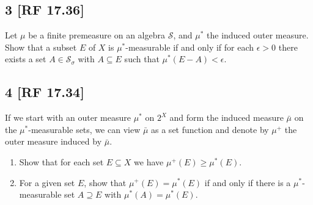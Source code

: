 \documentclass[12pt]{article}
\begin{document}
\subsection*{3 [RF 17.36]}
\begin{tcolorbox}
Let $\mu$ be a finite premeasure on an algebra $\mathcal{S}$, and $\mu^{*}$ the induced outer measure. Show that a subset $E$ of $X$ is
$\mu^*$-measurable if and only if for each $\epsilon > 0$ there exists a set $A \in \mathcal{S}_{\sigma}$ with $A\subseteq E$ such that $\mu^*(E-A) <
\epsilon$.
\end{tcolorbox}


\newpage
\subsection*{4 [RF 17.34]}
\begin{tcolorbox}
If we start with an outer measure $\mu^{*}$ on $2^{X}$ and form the induced measure $\bar{\mu}$ on the $\mu^{*}$-measurable sets, we can view
$\bar{\mu}$ as a set function and denote by $\mu^{+}$ the outer measure induced by $\bar{\mu}$.
\begin{enumerate}[label=(\alph*)]
\item Show that for each set $E \subseteq X$ we have $\mu^{+}(E) \geq \mu^{*}(E)$.
\item For a given set $E$, show that $\mu^{+}(E) = \mu^*(E)$ if and only if there is a $\mu^*$-measurable set $A \supseteq E$ with $\mu^*(A) =
\mu^*(E)$.
\end{enumerate}
\end{tcolorbox}
\end{document}
